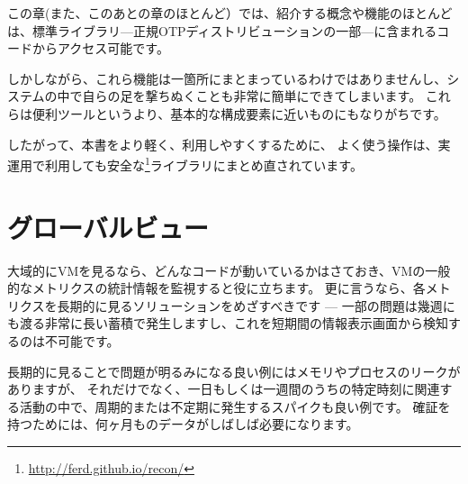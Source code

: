 この章(また、このあとの章のほとんど）では、紹介する概念や機能のほとんどは、標準ライブラリ---正規OTPディストリビューションの一部---に含まれるコードからアクセス可能です。

しかしながら、これら機能は一箇所にまとまっているわけではありませんし、システムの中で自らの足を撃ちぬくことも非常に簡単にできてしまいます。
これらは便利ツールというより、基本的な構成要素に近いものにもなりがちです。

したがって、本書をより軽く、利用しやすくするために、
よく使う操作は、実運用で利用しても安全な\footnote{\href{http://ferd.github.io/recon/}{http://ferd.github.io/recon/}}ライブラリにまとめ直されています。
\section{グローバルビュー}
\label{sec:global-view}

大域的にVMを見るなら、どんなコードが動いているかはさておき、VMの一般的なメトリクスの統計情報を監視すると役に立ちます。
更に言うなら、各メトリクスを長期的に見るソリューションをめざすべきです --- 一部の問題は幾週にも渡る非常に長い蓄積で発生しますし、これを短期間の情報表示画面から検知するのは不可能です。

長期的に見ることで問題が明るみになる良い例にはメモリやプロセスのリークがありますが、
それだけでなく、一日もしくは一週間のうちの特定時刻に関連する活動の中で、周期的または不定期に発生するスパイクも良い例です。
確証を持つためには、何ヶ月ものデータがしばしば必要になります。

